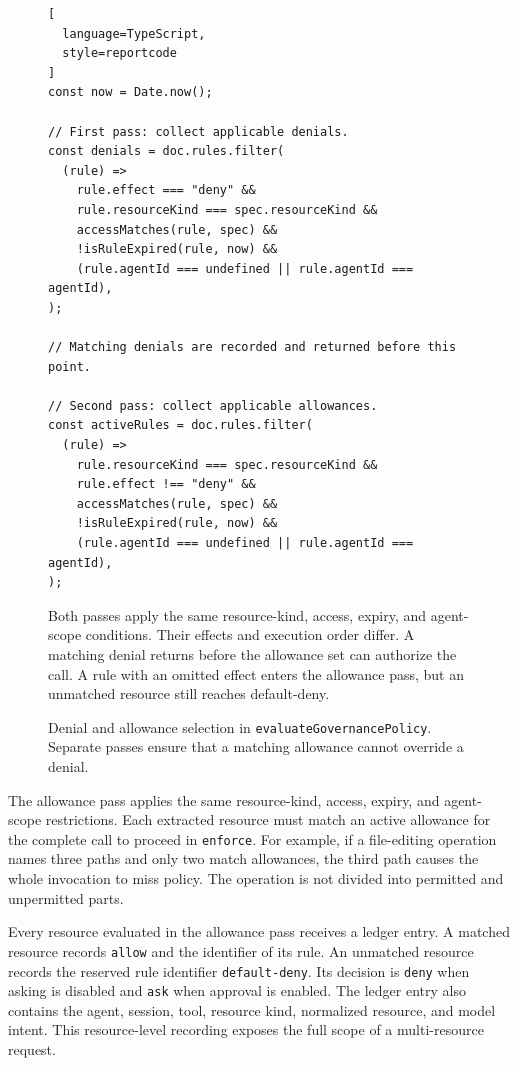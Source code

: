 \begin{figure}[htbp]
\centering
\begin{minipage}{0.96\textwidth}
\begin{reportcodebox}
\begin{lstlisting}[
  language=TypeScript,
  style=reportcode
]
const now = Date.now();

// First pass: collect applicable denials.
const denials = doc.rules.filter(
  (rule) =>
    rule.effect === "deny" &&
    rule.resourceKind === spec.resourceKind &&
    accessMatches(rule, spec) &&
    !isRuleExpired(rule, now) &&
    (rule.agentId === undefined || rule.agentId === agentId),
);

// Matching denials are recorded and returned before this point.

// Second pass: collect applicable allowances.
const activeRules = doc.rules.filter(
  (rule) =>
    rule.resourceKind === spec.resourceKind &&
    rule.effect !== "deny" &&
    accessMatches(rule, spec) &&
    !isRuleExpired(rule, now) &&
    (rule.agentId === undefined || rule.agentId === agentId),
);
\end{lstlisting}
\end{reportcodebox}

\smallskip
\footnotesize
Both passes apply the same resource-kind, access, expiry, and agent-scope
conditions. Their effects and execution order differ. A matching denial
returns before the allowance set can authorize the call. A rule with an
omitted effect enters the allowance pass, but an
unmatched resource still reaches default-deny.
\end{minipage}
\caption[Denial and allowance selection]{\footnotesize Denial and allowance
selection in \texttt{evaluateGovernancePolicy}. Separate passes ensure that a
matching allowance cannot override a denial.}
\label{fig:gov-code-evaluation-order}
\end{figure}

The allowance pass applies the same resource-kind, access, expiry, and
agent-scope restrictions. Each extracted resource must match an active
allowance for the complete call to proceed in \texttt{enforce}. For example,
if a file-editing operation names three paths and only two match allowances,
the third path causes the whole invocation to miss policy. The operation is
not divided into permitted and unpermitted parts.

Every resource evaluated in the allowance pass receives a ledger entry. A
matched resource records \texttt{allow} and the identifier of its rule. An
unmatched resource records the reserved rule identifier
\texttt{default-deny}. Its decision is \texttt{deny} when asking is disabled
and \texttt{ask} when approval is enabled. The ledger entry also contains the
agent, session, tool, resource kind, normalized resource, and model intent.
This resource-level recording exposes the full scope of a multi-resource
request.

